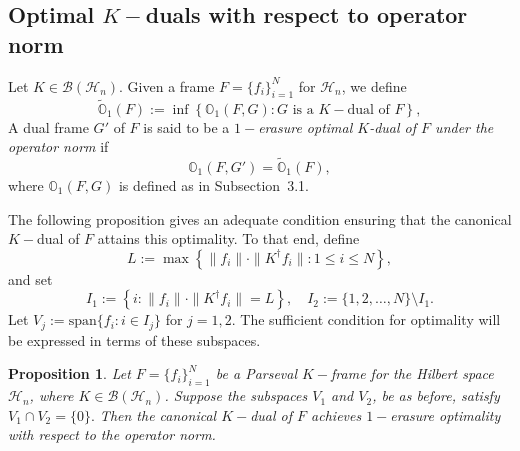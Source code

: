 \documentclass[final,1p,times]{elsarticle}
\newtheorem{prop}[thm]{Proposition}
\begin{document}
	\subsection{Optimal $K-$duals with respect to operator norm}
	
Let $K \in \mathcal{B}(\mathcal{H}_n)$. Given a frame $F = \{f_i\}_{i=1}^N$ for $\mathcal{H}_n$, we define
\[
\widetilde{\mathbb{O}}_{1}(F) := \inf \left\{ \mathbb{O}_{1}(F, G) : G \text{ is a $K-$dual of } F \right\},
\]
A dual frame \( G' \) of \( F \) is said to be a \textit{$1-$erasure optimal $K$-dual of $F$ under the operator norm} if
\[
\mathbb{O}_{1}(F, G') = \widetilde{\mathbb{O}}_{1}(F),
\]
where \( \mathbb{O}_{1}(F, G) \) is defined as in Subsection~3.1.

The following proposition gives an adequate condition ensuring that the canonical $K-$dual of $F$ attains this optimality. To that end, define
\[
L := \max \left\{ \|f_i\| \cdot \|K^\dag f_i\| : 1 \leq i \leq N \right\},
\]
and set
\[
I_1 := \left\{ i : \|f_i\| \cdot \|K^\dag f_i\| = L \right\}, \quad I_2 := \{1,2,\ldots,N\} \setminus I_1.
\]
Let $V_j := \mathrm{span}\{ f_i : i \in I_j \}$ for $j = 1,2$. The sufficient condition for optimality will be expressed in terms of these subspaces. 
	
	
\begin{prop}\label{prop4point1}
Let $F = \{f_i\}_{i=1}^N$ be a Parseval $K-$frame for the Hilbert space $\mathcal{H}_n$, where $K \in \mathcal{B}(\mathcal{H}_n)$. Suppose the subspaces $V_1$ and $V_2$, be as before, satisfy $V_1 \cap V_2 = \{0\}.$ Then the canonical $K-$dual of $F$ achieves $1-$erasure optimality with respect to the operator norm.
\end{prop}
\end{document}
